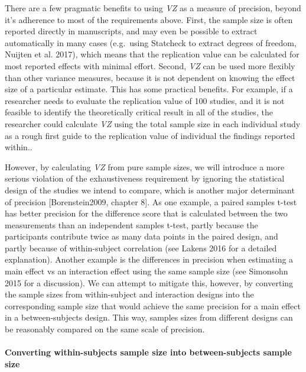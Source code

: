 \documentclass[]{article}
\let\oldparagraph\paragraph
\renewcommand{\paragraph}[1]{\oldparagraph{#1}\mbox{}}
\begin{document}
There are a few pragmatic benefits to using \emph{VZ} as a measure of
precision, beyond it's adherence to most of the requirements above.
First, the sample size is often reported directly in manuscripts, and
may even be possible to extract automatically in many cases (e.g.~using
Statcheck to extract degrees of freedom, Nuijten et al. 2017), which
means that the replication value can be calculated for most reported
effects with minimal effort. Second, \emph{VZ} can be used more flexibly
than other variance measures, because it is not dependent on knowing the
effect size of a particular estimate. This has some practical benefits.
For example, if a researcher needs to evaluate the replication value of
100 studies, and it is not feasible to identify the theoretically
critical result in all of the studies, the researcher could calculate
\emph{VZ} using the total sample size in each individual study as a
rough first guide to the replication value of individual the findings
reported within..

However, by calculating \emph{VZ} from pure sample sizes, we will
introduce a more serious violation of the exhaustiveness requirement by
ignoring the statistical design of the studies we intend to compare,
which is another major determinant of precision {[}Borenstein2009,
chapter 8{]}. As one example, a paired samples t-test has better
precision for the difference score that is calculated between the two
measurements than an independent samples t-test, partly because the
participants contribute twice as many data points in the paired design,
and partly because of within-subject correlation (see Lakens 2016 for a
detailed explanation). Another example is the differences in precision
when estimating a main effect vs an interaction effect using the same
sample size (see Simonsohn 2015 for a discussion). We can attempt to
mitigate this, however, by converting the sample sizes from
within-subject and interaction designs into the corresponding sample
size that would achieve the same precision for a main effect in a
between-subjects design. This way, samples sizes from different designs
can be reasonably compared on the same scale of precision.

\hypertarget{converting-within-subjects-sample-size-into-between-subjects-sample-size}{%
\paragraph{Converting within-subjects sample size into between-subjects
sample
size}\label{converting-within-subjects-sample-size-into-between-subjects-sample-size}}
\end{document}
